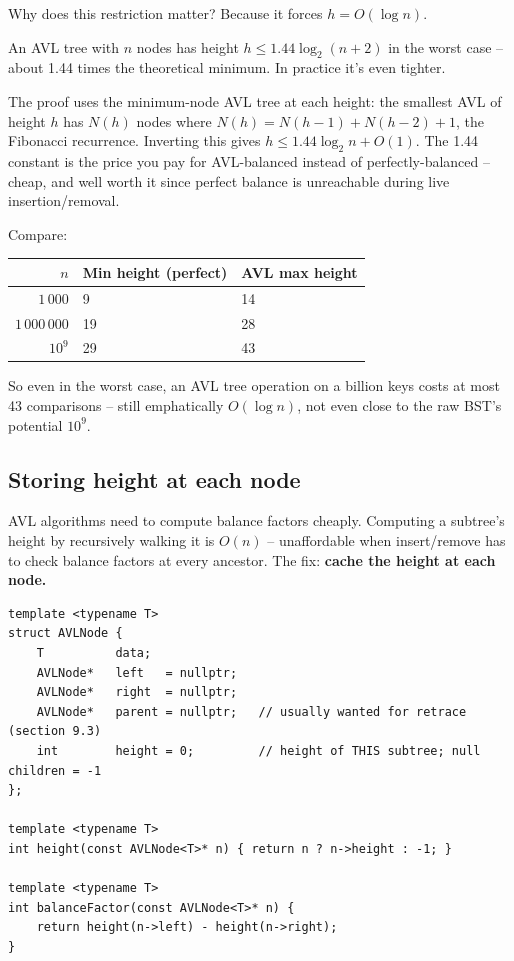 \documentclass[11pt]{article}
\begin{document}
Why does this restriction matter? Because it forces $h = O(\log n)$.

\begin{defnbox}
An AVL tree with $n$ nodes has height $h \le 1.44 \log_2(n+2)$ in the worst case -- about 1.44 times the theoretical minimum. In practice it's even tighter.
\end{defnbox}

The proof uses the minimum-node AVL tree at each height: the smallest AVL of height $h$ has $N(h)$ nodes where $N(h) = N(h-1) + N(h-2) + 1$, the Fibonacci recurrence. Inverting this gives $h \le 1.44 \log_2 n + O(1)$. The 1.44 constant is the price you pay for AVL-balanced instead of perfectly-balanced -- cheap, and well worth it since perfect balance is unreachable during live insertion/removal.

Compare:
\begin{center}
\begin{tabular}{rll}
$n$ & Min height (perfect) & AVL max height \\
\hline
$1\,000$        & 9  & 14 \\
$1\,000\,000$   & 19 & 28 \\
$10^9$          & 29 & 43 \\
\end{tabular}
\end{center}

So even in the worst case, an AVL tree operation on a billion keys costs at most 43 comparisons -- still emphatically $O(\log n)$, not even close to the raw BST's potential $10^9$.

\subsection*{Storing height at each node}

AVL algorithms need to compute balance factors cheaply. Computing a subtree's height by recursively walking it is $O(n)$ -- unaffordable when insert/remove has to check balance factors at every ancestor. The fix: \textbf{cache the height at each node.}

\begin{lstlisting}
template <typename T>
struct AVLNode {
    T          data;
    AVLNode*   left   = nullptr;
    AVLNode*   right  = nullptr;
    AVLNode*   parent = nullptr;   // usually wanted for retrace (section 9.3)
    int        height = 0;         // height of THIS subtree; null children = -1
};

template <typename T>
int height(const AVLNode<T>* n) { return n ? n->height : -1; }

template <typename T>
int balanceFactor(const AVLNode<T>* n) {
    return height(n->left) - height(n->right);
}
\end{lstlisting}
\end{document}
